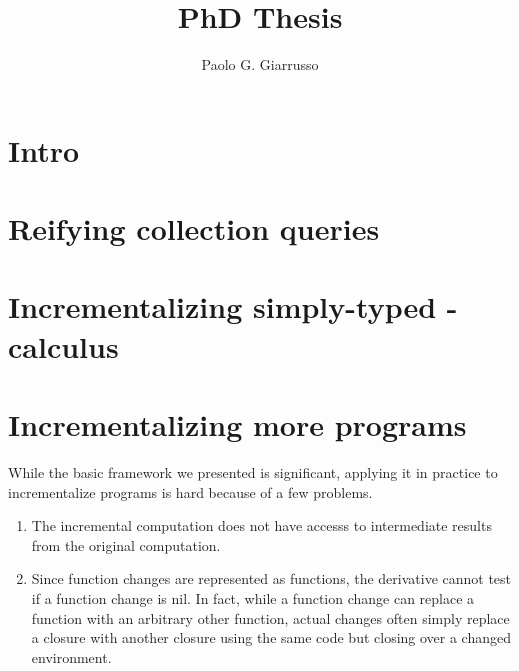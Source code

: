 \documentclass{book}
\title{PhD Thesis}
\author{Paolo G. Giarrusso}
\begin{document}
\maketitle
\chapter{Intro}
\chapter{Reifying collection queries}





\newcommand{\co}[1]{\code{#1}} %
\chapter{Incrementalizing simply-typed \TitleLambda{}-calculus}
















\begin{oldSec}

\end{oldSec}

\begin{oldSec}

\end{oldSec}

\chapter{Incrementalizing more programs}

While the basic framework we presented is significant, applying it in practice
to incrementalize programs is hard because of a few problems.
\begin{enumerate}
\item The incremental computation does not have accesss to intermediate results from the original computation.
\item Since function changes are represented as functions, the derivative cannot
  test if a function change is nil. In fact, while a function change can replace
  a function with an arbitrary other function, actual changes often simply
  replace a closure with another closure using the same code but closing over a
  changed environment.
\end{enumerate}
\end{document}
